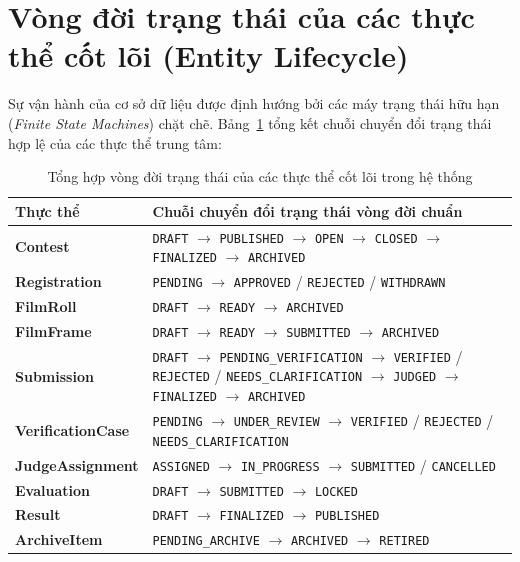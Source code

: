 \section{Vòng đời trạng thái của các thực thể cốt lõi (Entity Lifecycle)}
\label{s:c4_lifecycles}

Sự vận hành của cơ sở dữ liệu được định hướng bởi các máy trạng thái hữu hạn (\textit{Finite State Machines}) chặt chẽ. Bảng~\ref{tab:c4_lifecycles} tổng kết chuỗi chuyển đổi trạng thái hợp lệ của các thực thể trung tâm:

\begin{table}[!ht]
\centering
\caption{Tổng hợp vòng đời trạng thái của các thực thể cốt lõi trong hệ thống}
\label{tab:c4_lifecycles}
\scriptsize
\renewcommand{\arraystretch}{0.92}
\begin{tabularx}{\textwidth}{>{\bfseries}p{3.0cm}>{\raggedright\arraybackslash}X}
\toprule
\textbf{Thực thể} & \textbf{Chuỗi chuyển đổi trạng thái vòng đời chuẩn} \\
\midrule
Contest & \texttt{DRAFT} $\rightarrow$ \texttt{PUBLISHED} $\rightarrow$ \texttt{OPEN} $\rightarrow$ \texttt{CLOSED} $\rightarrow$ \texttt{FINALIZED} $\rightarrow$ \texttt{ARCHIVED} \\
Registration & \texttt{PENDING} $\rightarrow$ \texttt{APPROVED} / \texttt{REJECTED} / \texttt{WITHDRAWN} \\
FilmRoll & \texttt{DRAFT} $\rightarrow$ \texttt{READY} $\rightarrow$ \texttt{ARCHIVED} \\
FilmFrame & \texttt{DRAFT} $\rightarrow$ \texttt{READY} $\rightarrow$ \texttt{SUBMITTED} $\rightarrow$ \texttt{ARCHIVED} \\
Submission & \texttt{DRAFT} $\rightarrow$ \texttt{PENDING\_VERIFICATION} $\rightarrow$ \texttt{VERIFIED} / \texttt{REJECTED} / \texttt{NEEDS\_CLARIFICATION} $\rightarrow$ \texttt{JUDGED} $\rightarrow$ \texttt{FINALIZED} $\rightarrow$ \texttt{ARCHIVED} \\
VerificationCase & \texttt{PENDING} $\rightarrow$ \texttt{UNDER\_REVIEW} $\rightarrow$ \texttt{VERIFIED} / \texttt{REJECTED} / \texttt{NEEDS\_CLARIFICATION} \\
JudgeAssignment & \texttt{ASSIGNED} $\rightarrow$ \texttt{IN\_PROGRESS} $\rightarrow$ \texttt{SUBMITTED} / \texttt{CANCELLED} \\
Evaluation & \texttt{DRAFT} $\rightarrow$ \texttt{SUBMITTED} $\rightarrow$ \texttt{LOCKED} \\
Result & \texttt{DRAFT} $\rightarrow$ \texttt{FINALIZED} $\rightarrow$ \texttt{PUBLISHED} \\
ArchiveItem & \texttt{PENDING\_ARCHIVE} $\rightarrow$ \texttt{ARCHIVED} $\rightarrow$ \texttt{RETIRED} \\
\bottomrule
\end{tabularx}
\end{table}

